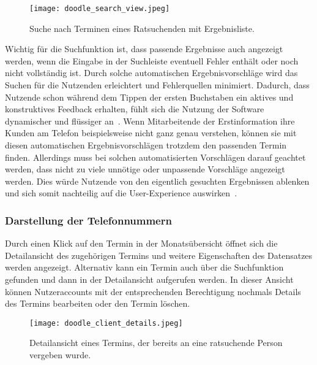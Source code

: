 \begin{figure}[H]
    \caption{Suche nach Terminen eines Ratsuchenden mit Ergebnisliste.}
    \centering
    \texttt{[image: doodle\_search\_view.jpeg]}
\end{figure}

Wichtig für die Suchfunktion ist, dass passende Ergebnisse auch angezeigt
werden, wenn die Eingabe in der Suchleiste eventuell Fehler enthält oder noch
nicht vollständig ist. Durch solche automatischen Ergebnisvorschläge wird das
Suchen für die Nutzenden erleichtert und Fehlerquellen minimiert. Dadurch, dass
Nutzende schon während dem Tippen der ersten Buchstaben ein aktives und
konstruktives Feedback erhalten, fühlt sich die Nutzung der Software
dynamischer und flüssiger an~\cite{autoCompletion}. Wenn Mitarbeitende der
Erstinformation ihre Kunden am Telefon beispielsweise nicht ganz genau
verstehen, können sie mit diesen automatischen Ergebnisvorschlägen trotzdem den
passenden Termin finden. Allerdings muss bei solchen automatisierten
Vorschlägen darauf geachtet werden, dass nicht zu viele unnötige oder
unpassende Vorschläge angezeigt werden. Dies würde Nutzende von den eigentlich
gesuchten Ergebnissen ablenken und sich somit nachteilig auf die
User-Experience auswirken~\cite{autosuggModeration}.

\subsubsection{Darstellung der Telefonnummern}

Durch einen Klick auf den Termin in der Monatsübersicht öffnet sich die
Detailansicht des zugehörigen Termins und weitere Eigenschaften des Datensatzes
werden angezeigt. Alternativ kann ein Termin auch über die Suchfunktion
gefunden und dann in der Detailansicht aufgerufen werden. In dieser Ansicht
können Nutzeraccounts mit der entsprechenden Berechtigung nochmals Details des
Termins bearbeiten oder den Termin löschen.

\begin{figure}[H]
    \caption{Detailansicht eines Termins, der bereits an eine ratsuchende Person vergeben wurde.}
    \centering
    \texttt{[image: doodle\_client\_details.jpeg]}
\end{figure}

